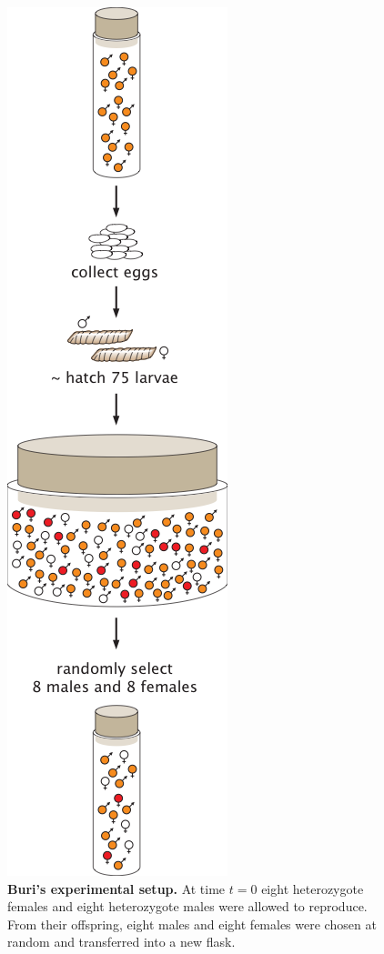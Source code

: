 \begin{figure}[h!]
\centering \includegraphics[scale=0.8]
  {../fig/drift_langevin/02_01_01_buri_schematic.png}
  \caption{\textbf{Buri's experimental setup.} At time $t=0$ eight
  heterozygote females and eight heterozygote males were allowed to reproduce.
  From their offspring, eight males and eight females were chosen at random and
  transferred into a new flask.}
  \label{fig_buri_schematic}
\end{figure}

